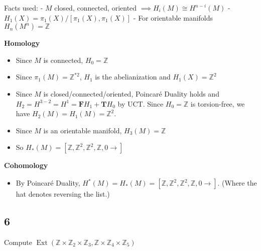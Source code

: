 \begin{solution}

Facts used: - \(M\) closed, connected, oriented
\(\implies H_i(M)\cong H^{n-i}(M)\) -
\(H_1(X) = \pi_1(X) / [\pi_1(X), \pi_1(X)]\) - For orientable manifolds
\(H_n(M^n) = {\mathbb{Z}}\)

\textbf{Homology}

\begin{itemize}
\tightlist
\item
  Since \(M\) is connected, \(H_0 = {\mathbb{Z}}\)
\item
  Since \(\pi_1(M) = {\mathbb{Z}}^{\ast 2}\), \(H_1\) is the
  abelianization and \(H_1(X) = {\mathbb{Z}}^2\)
\item
  Since \(M\) is closed/connected/oriented, Poincaré Duality holds and
  \(H_2 = H^{3-2} = H^1 = \mathbf{F} H_1 + \mathbf{T}H_0\) by UCT. Since
  \(H_0={\mathbb{Z}}\) is torsion-free, we have
  \(H_2(M) = H_1(M) = {\mathbb{Z}}^2\).
\item
  Since \(M\) is an orientable manifold, \(H_3(M) = {\mathbb{Z}}\)
\item
  So
  \(H_*(M) = [{\mathbb{Z}}, {\mathbb{Z}}^2, {\mathbb{Z}}^2, {\mathbb{Z}}, 0\rightarrow]\)
\end{itemize}

\textbf{Cohomology}

\begin{itemize}
\tightlist
\item
  By Poincaré Duality,
  \(H^*(M) = \widehat{H_*(M)} = [{\mathbb{Z}}, {\mathbb{Z}}^2, {\mathbb{Z}}^2, {\mathbb{Z}}, 0\rightarrow]\).
  (Where the hat denotes reversing the list.)
\end{itemize}

\end{solution}

\hypertarget{section-10}{%
\subsection{6}\label{section-10}}

Compute
\(\operatorname{Ext} ({\mathbb{Z}}\times {\mathbb{Z}}_2 \times {\mathbb{Z}}_3, {\mathbb{Z}}\times {\mathbb{Z}}_4 \times {\mathbb{Z}}_5)\)

